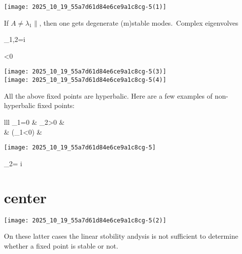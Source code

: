 \begin{center}
\texttt{[image: 2025\_10\_19\_55a7d61d84e6ce9a1c8cg-5(1)]}
\end{center}
If $A \neq \lambda_{1} \|$, then one gets degenerate (m)stable modes.\
Complex eigenvolves
\begin{DispWithArrows}[format=c, displaystyle]
\lambda_{1,2}=\gamma \pm i \omega
\end{DispWithArrows}
\begin{DispWithArrows}[format=c, displaystyle]
\gamma<0 \quad {}
\end{DispWithArrows}
\texttt{[image: 2025\_10\_19\_55a7d61d84e6ce9a1c8cg-5(3)]}\\
\texttt{[image: 2025\_10\_19\_55a7d61d84e6ce9a1c8cg-5(4)]}

All the above fixed points are hyperbalic. Here are a few examples of non-hyperbalic fixed points:
\begin{DispWithArrows}[format=c, displaystyle]
\begin{array}{lll}
\lambda_{1}=0 & \lambda_{2}>0 &  \\
& \left(\lambda_{1}<0\right) & 
\end{array}
\end{DispWithArrows}
\begin{center}
\texttt{[image: 2025\_10\_19\_55a7d61d84e6ce9a1c8cg-5]}
\end{center}
\begin{DispWithArrows}[format=c, displaystyle]
 \quad \lambda_{2}= \pm i \omega
\end{DispWithArrows}
\section*{center}
\begin{center}
\texttt{[image: 2025\_10\_19\_55a7d61d84e6ce9a1c8cg-5(2)]}
\end{center}
On these latter cases the linear stobility andysis is not sufficient to determine whether a fixed point is stable or not.

